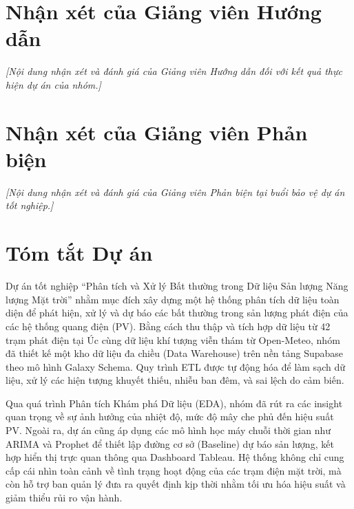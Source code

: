 \documentclass[12pt, a4paper]{report}
\begin{document}
\chapter*{Nhận xét của Giảng viên Hướng dẫn}
\textit{[Nội dung nhận xét và đánh giá của Giảng viên Hướng dẫn đối với kết quả thực hiện dự án của nhóm.]}

\chapter*{Nhận xét của Giảng viên Phản biện}
\textit{[Nội dung nhận xét và đánh giá của Giảng viên Phản biện tại buổi bảo vệ dự án tốt nghiệp.]}

\chapter*{Tóm tắt Dự án}
Dự án tốt nghiệp ``Phân tích và Xử lý Bất thường trong Dữ liệu Sản lượng Năng lượng Mặt trời'' nhằm mục đích xây dựng một hệ thống phân tích dữ liệu toàn diện để phát hiện, xử lý và dự báo các bất thường trong sản lượng phát điện của các hệ thống quang điện (PV). 
Bằng cách thu thập và tích hợp dữ liệu từ 42 trạm phát điện tại Úc cùng dữ liệu khí tượng viễn thám từ Open-Meteo, nhóm đã thiết kế một kho dữ liệu đa chiều (Data Warehouse) trên nền tảng Supabase theo mô hình Galaxy Schema. Quy trình ETL được tự động hóa để làm sạch dữ liệu, xử lý các hiện tượng khuyết thiếu, nhiễu ban đêm, và sai lệch do cảm biến. 

Qua quá trình Phân tích Khám phá Dữ liệu (EDA), nhóm đã rút ra các insight quan trọng về sự ảnh hưởng của nhiệt độ, mức độ mây che phủ đến hiệu suất PV. Ngoài ra, dự án cũng áp dụng các mô hình học máy chuỗi thời gian như ARIMA và Prophet để thiết lập đường cơ sở (Baseline) dự báo sản lượng, kết hợp hiển thị trực quan thông qua Dashboard Tableau. Hệ thống không chỉ cung cấp cái nhìn toàn cảnh về tình trạng hoạt động của các trạm điện mặt trời, mà còn hỗ trợ ban quản lý đưa ra quyết định kịp thời nhằm tối ưu hóa hiệu suất và giảm thiểu rủi ro vận hành.

\tableofcontents
\listoffigures
\listoftables
\end{document}
